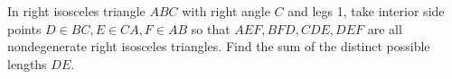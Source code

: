 In right isosceles triangle $ABC$ with right angle $C$ and legs 1, take interior side points $D\in BC,E\in CA,F\in AB$ so that $AEF,BFD,CDE,DEF$ are all nondegenerate right isosceles triangles. Find the sum of the distinct possible lengths $DE$.
